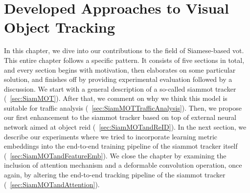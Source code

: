 \chapter{Developed Approaches to Visual Object Tracking}
\label{chap:DevelopedVisualTrackingApproaches}

In this chapter, we dive into our contributions to the field of Siamese-based \gls{vot}. This entire chapter follows a specific pattern. It consists of five sections in total, and every section begins with motivation, then elaborates on some particular solution, and finishes off by providing experimental evaluation followed by a discussion. We start with a general description of a so-called \gls{siammot} tracker (\sectiontext{}~\ref{sec:SiamMOT}). After that, we comment on why we think this model is suitable for traffic analysis (\sectiontext{}~\ref{sec:SiamMOTTrafficAnalysis}). Then, we propose our first enhancement to the \gls{siammot} tracker based on top of external neural network aimed at object \gls{reid} (\sectiontext{}~\ref{sec:SiamMOTandReID}). In the next section, we describe our experiments where we tried to incorporate learning metric embeddings into the end-to-end training pipeline of the \gls{siammot} tracker itself (\sectiontext{}~\ref{sec:SiamMOTandFeatureEmb}). We close the chapter by examining the inclusion of attention mechanism and a deformable convolution operation, once again, by altering the end-to-end tracking pipeline of the \gls{siammot} tracker (\sectiontext{}~\ref{sec:SiamMOTandAttention}).






